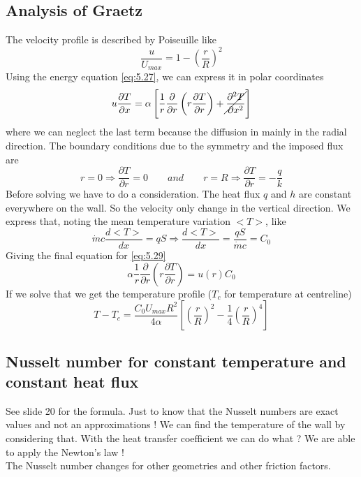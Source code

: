	\subsection{Analysis of Graetz}
		The velocity profile is described by Poiseuille like 
		\begin{equation}
			\frac{u}{U_{max}} = 1 - \left( \frac{r}{R} \right)^2
		\end{equation}
		Using the energy equation \autoref{eq:5.27}, we can express it in polar coordinates 
		\begin{equation}
			u \frac{\partial T}{\partial x} = \alpha \left[ \frac{1}{r}\frac{\partial }{\partial r} \left( r\frac{\partial T}{\partial r}\right) + \cancel{\frac{\partial ^2 T}{\partial x^2}} \right]
			\label{eq:5.29}
		\end{equation}
		where we can neglect the last term because the diffusion in mainly in the radial direction. The boundary conditions due to the symmetry and the imposed flux are 
		\begin{equation}
			r = 0 \Rightarrow \frac{\partial T}{\partial r} = 0 \qquad and \qquad
			r = R \Rightarrow \frac{\partial T}{\partial r} = -\frac{q}{k}
		\end{equation}
		Before solving we have to do a consideration. The heat flux $q$ and $h$ are constant everywhere on the wall. So the velocity only change in the vertical direction. We express that, noting the mean temperature variation $<T>$, like 
		\begin{equation}
			\dot{m}c \frac{d <T>}{dx} = qS \Rightarrow \frac{d <T>}{dx} = \frac{qS}{\dot{m}c} = C_0
		\end{equation}
		Giving the final equation for \autoref{eq:5.29}
		\begin{equation}
			\alpha \frac{1}{r}\frac{\partial }{\partial r} \left( r\frac{\partial T}{\partial r}\right) = u(r) C_0
		\end{equation}
		If we solve that we get the temperature profile ($T_c$ for temperature at centreline)
		\begin{equation}
			T-T_c = \frac{C_0 U_{max}R^2}{4\alpha} \left[ \left( \frac{r}{R} \right)^2 - \frac{1}{4}\left( \frac{r}{R} \right)^4 \right]
		\end{equation}
	
	\subsection{Nusselt number for constant temperature and constant heat flux}
		See slide 20 for the formula. Just to know that the Nusselt numbers are exact values and not an approximations !  We can find the temperature of the wall by considering that. With the heat transfer coefficient we can do what ? We are able to apply the Newton's law ! \\
		The Nusselt number changes for other geometries and other friction factors. 
		
